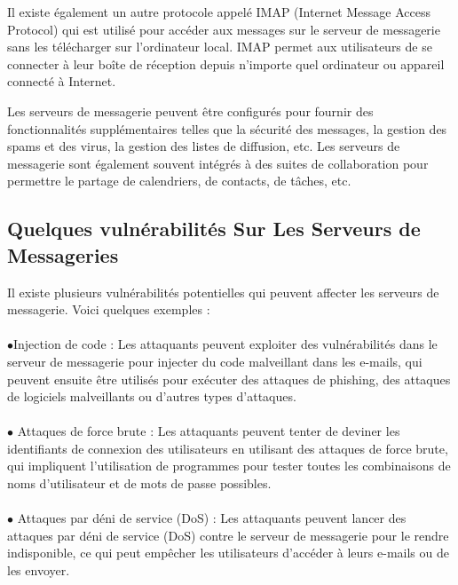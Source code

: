 Il existe également un autre protocole appelé IMAP (Internet Message Access Protocol) qui est utilisé pour accéder aux messages sur le serveur de messagerie sans les télécharger sur l'ordinateur local. IMAP permet aux utilisateurs de se connecter à leur boîte de réception depuis n'importe quel ordinateur ou appareil connecté à Internet.

Les serveurs de messagerie peuvent être configurés pour fournir des fonctionnalités supplémentaires telles que la sécurité des messages, la gestion des spams et des virus, la gestion des listes de diffusion, etc. Les serveurs de messagerie sont également souvent intégrés à des suites de collaboration pour permettre le partage de calendriers, de contacts, de tâches, etc.
\subsection{Quelques vulnérabilités Sur Les Serveurs de Messageries }
Il existe plusieurs vulnérabilités potentielles qui peuvent affecter les serveurs de messagerie. Voici quelques exemples :
\paragraph{ }
$\bullet$Injection de code : Les attaquants peuvent exploiter des vulnérabilités dans le serveur de messagerie pour injecter du code malveillant dans les e-mails, qui peuvent ensuite être utilisés pour exécuter des attaques de phishing, des attaques de logiciels malveillants ou d'autres types d'attaques.

\paragraph{ }
$\bullet$ Attaques de force brute : Les attaquants peuvent tenter de deviner les identifiants de connexion des utilisateurs en utilisant des attaques de force brute, qui impliquent l'utilisation de programmes pour tester toutes les combinaisons de noms d'utilisateur et de mots de passe possibles.

\paragraph{ }
$\bullet$ Attaques par déni de service (DoS) : Les attaquants peuvent lancer des attaques par déni de service (DoS) contre le serveur de messagerie pour le rendre indisponible, ce qui peut empêcher les utilisateurs d'accéder à leurs e-mails ou de les envoyer.

